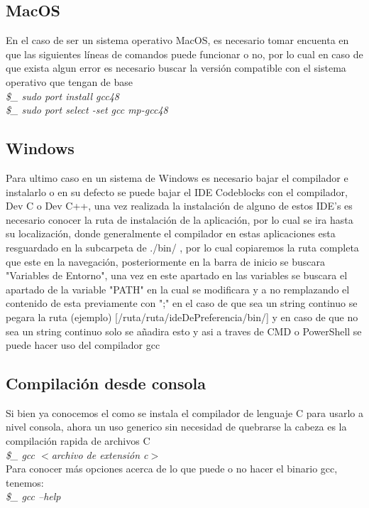 \documentclass[10pt,executivepaper]{article}
\newcommand\tab[1][1cm]{\hspace*{#1}}
\begin{document}
\subsection{MacOS}
En el caso de ser un sistema operativo MacOS, es necesario tomar encuenta en que las siguientes líneas de comandos puede funcionar o no, por lo cual en caso de que exista algun error es necesario buscar la versión compatible con el sistema operativo que tengan de base\\
\tab \textit{\$\_ sudo port install gcc48\\
\tab\$\_ sudo port select -set gcc mp-gcc48}
\subsection{Windows}
Para ultimo caso en un sistema de Windows es necesario bajar el compilador e instalarlo o en su defecto se puede bajar el IDE Codeblocks con el compilador, Dev C o Dev C++, una vez realizada la instalación de alguno de estos IDE's es necesario conocer la ruta de instalación de la aplicación, por lo cual se ira hasta su localización, donde generalmente el compilador en estas aplicaciones esta resguardado en la subcarpeta de ./bin/ , por lo cual copiaremos la ruta completa que este en la navegación, posteriormente en la barra de inicio se buscara "Variables de Entorno", una vez en este apartado en las variables se buscara el apartado de la variable "PATH" en la cual se modificara y a no remplazando el contenido de esta previamente con ";" en el caso de que sea un string continuo se pegara la ruta (ejemplo) [/ruta/ruta/ideDePreferencia/bin/] y en caso de que no sea un string continuo solo se añadira esto y asi a traves de CMD o PowerShell se puede hacer uso del compilador gcc
\subsection{Compilación desde consola}
Si bien ya conocemos el como se instala el compilador de lenguaje C para usarlo a nivel consola, ahora un uso generico sin necesidad de quebrarse la cabeza es la compilación rapida de archivos C
\\
\tab \textit{\$\_ gcc $<$archivo de extensión c$>$}\\
Para conocer más opciones acerca de lo que puede o no hacer el binario gcc, tenemos:\\
\tab \textit{\$\_ gcc --help}
\end{document}
